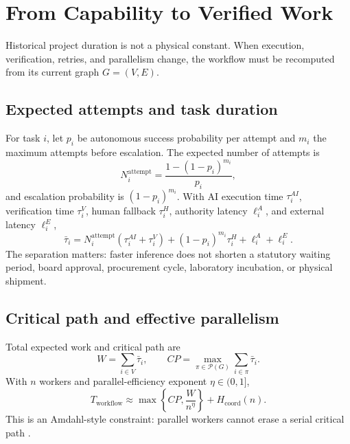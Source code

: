 
\section{From Capability to Verified Work}

Historical project duration is not a physical constant. When execution, verification, retries, and parallelism change, the workflow must be recomputed from its current graph $G=(V,E)$.

\subsection{Expected attempts and task duration}

For task $i$, let $p_i$ be autonomous success probability per attempt and $m_i$ the maximum attempts before escalation. The expected number of attempts is
\begin{equation}
N_i^{\mathrm{attempt}}=\frac{1-(1-p_i)^{m_i}}{p_i},
\end{equation}
and escalation probability is $(1-p_i)^{m_i}$. With AI execution time $\tau_i^{AI}$, verification time $\tau_i^V$, human fallback $\tau_i^H$, authority latency $\ell_i^A$, and external latency $\ell_i^E$,
\begin{equation}
\label{eq:task-duration}
\bar\tau_i=N_i^{\mathrm{attempt}}(\tau_i^{AI}+\tau_i^V)+(1-p_i)^{m_i}\tau_i^H+\ell_i^A+\ell_i^E.
\end{equation}
The separation matters: faster inference does not shorten a statutory waiting period, board approval, procurement cycle, laboratory incubation, or physical shipment.

\subsection{Critical path and effective parallelism}

Total expected work and critical path are
\begin{equation}
W=\sum_{i\in V}\bar\tau_i,\qquad
CP=\max_{\pi\in\mathcal P(G)}\sum_{i\in\pi}\bar\tau_i.
\end{equation}
With $n$ workers and parallel-efficiency exponent $\eta\in(0,1]$,
\begin{equation}
\label{eq:workflow-time}
\boxed{T_{\mathrm{workflow}}\approx\max\left\{CP,\frac{W}{n^\eta}\right\}+H_{\mathrm{coord}}(n).}
\end{equation}
This is an Amdahl-style constraint: parallel workers cannot erase a serial critical path \citep{amdahl1967,gustafson1988}.

